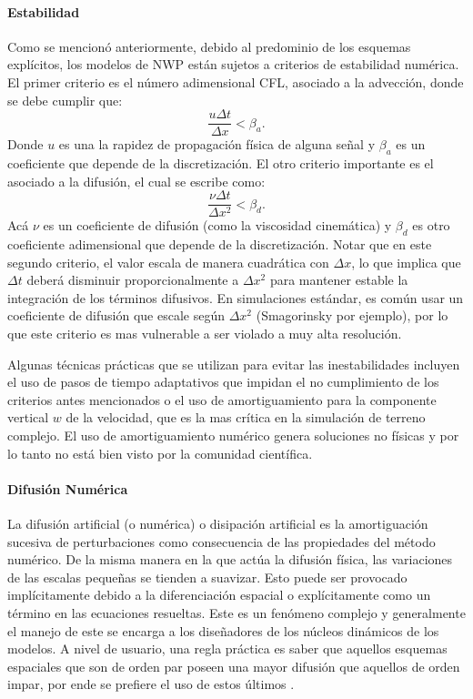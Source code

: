 \paragraph{Estabilidad} Como se mencionó anteriormente, debido al predominio de los esquemas explícitos, los modelos de NWP están sujetos a criterios de estabilidad numérica. El primer criterio es el número adimensional CFL, asociado a la advección, donde se debe cumplir que:
\begin{equation}\label{eq:cfl}
\frac{u\Delta t}{\Delta x}<\beta_a.
\end{equation}
Donde $u$ es una la rapidez de propagación física de alguna señal y $\beta_a$ es un coeficiente que depende de la discretización. El otro criterio importante es el asociado a la difusión, el cual se escribe como:
\begin{equation}\label{eq:cfl_d}
\frac{\nu\Delta t}{\Delta x^2}<\beta_d.
\end{equation}
Acá $\nu$ es un coeficiente de difusión (como la viscosidad cinemática) y $\beta_d$ es otro coeficiente adimensional que depende de la discretización. Notar que en este segundo criterio, el valor escala de manera cuadrática con $\Delta x$, lo que implica que $\Delta t$ deberá disminuir proporcionalmente a $\Delta x^2$ para mantener estable la integración de los términos difusivos. En simulaciones estándar, es común usar un coeficiente de difusión que escale según $\Delta x^2$ (Smagorinsky por ejemplo), por lo que este criterio es mas vulnerable a ser violado a muy alta resolución.

Algunas técnicas prácticas que se utilizan para evitar las inestabilidades incluyen el uso de pasos de tiempo adaptativos que impidan el no cumplimiento de los criterios antes mencionados o el uso de amortiguamiento para la componente vertical $w$ de la velocidad, que es la mas crítica en la simulación de terreno complejo. El uso de amortiguamiento numérico genera soluciones no físicas y por lo tanto no está bien visto por la comunidad científica.

\paragraph{Difusión Numérica} La difusión artificial (o numérica) o disipación artificial es la amortiguación sucesiva de perturbaciones como consecuencia de las propiedades del método numérico. De la misma manera en la que actúa la difusión física, las variaciones de las escalas pequeñas se tienden a suavizar. Esto puede ser provocado implícitamente debido a la diferenciación espacial o explícitamente como un término en las ecuaciones resueltas. Este es un fenómeno complejo y generalmente el manejo de este se encarga a los diseñadores de los núcleos dinámicos de los modelos. A nivel de usuario, una regla práctica es saber que aquellos esquemas espaciales que son de orden par poseen una mayor difusión que aquellos de orden impar, por ende se prefiere el uso de estos últimos \citep{arnold2012high}.

